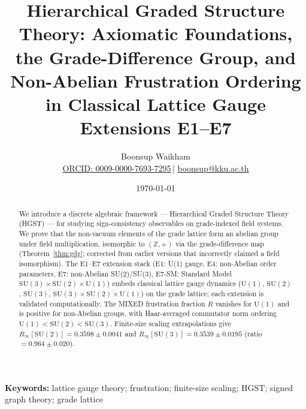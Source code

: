 \documentclass[12pt,a4paper]{article}
\theoremstyle{plain}
\theoremstyle{definition}
\theoremstyle{remark}
\newcommand{\RinfSUtwo}{0.3598 \pm 0.0041}          %
\newcommand{\RinfSUthree}{0.3539 \pm 0.0195}      %
\newcommand{\RinfRatio}{0.964 \pm 0.020}                      %
\begin{document}
\title{Hierarchical Graded Structure Theory: Axiomatic Foundations,
the Grade-Difference Group, and Non-Abelian Frustration Ordering
in Classical Lattice Gauge Extensions E1--E7}

\author[1]{Boonsup Waikham\\
  \small\href{https://orcid.org/0009-0000-7693-7295}{ORCID: 0009-0000-7693-7295}\,|
  \href{mailto:boonsup@kku.ac.th}{boonsup@kku.ac.th}}

\date{\today}

\maketitle

\begin{abstract}
We introduce a discrete algebraic framework --- Hierarchical Graded
Structure Theory (HGST) --- for studying sign-consistency observables on
grade-indexed field systems.
We prove that the non-vacuum elements of the grade lattice form an abelian
group under field multiplication, isomorphic to $(\mathbb{Z},+)$ via the
grade-difference map (Theorem~\ref{thm:gdg}; corrected from earlier versions
that incorrectly claimed a field isomorphism).
The E1--E7 extension stack (E1: U(1) gauge, E4: non-Abelian order parameters, E7: non-Abelian SU(2)/SU(3), E7-SM: Standard Model $\mathrm{SU}(3){\times}\mathrm{SU}(2){\times}\mathrm{U}(1)$) embeds classical lattice gauge dynamics
($\mathrm{U}(1)$, $\mathrm{SU}(2)$, $\mathrm{SU}(3)$,
$\mathrm{SU}(3){\times}\mathrm{SU}(2){\times}\mathrm{U}(1)$)
on the grade lattice; each extension is validated computationally.
The MIXED frustration fraction $R$ vanishes for $\mathrm{U}(1)$ and is
positive for non-Abelian groups, with Haar-averaged commutator norm
ordering $\mathrm{U}(1) < \mathrm{SU}(2) < \mathrm{SU}(3)$.
Finite-size scaling extrapolations give
$R_\infty[\mathrm{SU}(2)] = \RinfSUtwo$ and
$R_\infty[\mathrm{SU}(3)] = \RinfSUthree$ (ratio $= \RinfRatio$).

\end{abstract}

\noindent\textbf{Keywords:} lattice gauge theory; frustration; finite-size scaling; HGST; signed graph theory; grade lattice
\end{document}
